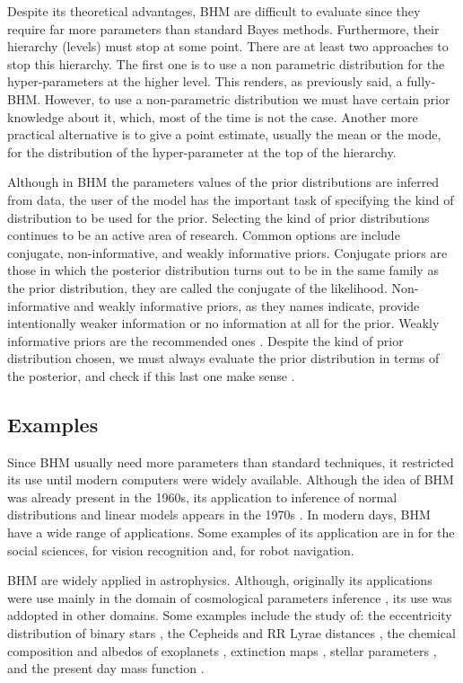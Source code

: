 Despite its theoretical advantages, BHM are difficult to evaluate since they require far more parameters than standard Bayes methods.
Furthermore, their hierarchy (levels) must stop at some point. There are at least two approaches to stop this hierarchy. The first one is to use a non parametric distribution for the hyper-parameters at the higher level. This renders, as previously said, a fully-BHM. However, to use a non-parametric distribution we must have certain prior knowledge about it, which, most of the time is not the case. Another more practical alternative is to give a point estimate, usually the mean or the mode, for the distribution of the hyper-parameter at the top of the hierarchy.  

Although in BHM the parameters values of the prior distributions are inferred from data, the user of the model has the important task of specifying the kind of distribution to be used for the prior. Selecting the kind of prior distributions continues to be an active area of research. Common options are include conjugate, non-informative, and weakly informative priors. Conjugate priors are those in which the posterior distribution turns out to be in the same family as the prior distribution, they are called the conjugate of the likelihood. Non-informative and weakly informative priors, as they names indicate, provide intentionally weaker information or no information at all for the prior. Weakly informative priors are the recommended ones \cite[see for example the works of][]{Gelman2006,Huang2013,Chung2015}. Despite the kind of prior distribution chosen, we must always evaluate the prior distribution in terms of the posterior, and check if this last one make sense \cite[][ Chap. 6]{Gelman2006,Gelman2013}.
\subsection{Examples}
Since BHM usually need more parameters than standard techniques, it restricted its use until modern computers were widely available.  
Although the idea of BHM was already present in the 1960s, its application to inference of normal distributions and linear models appears in the 1970s \cite[see][for an historical perspective of BHM]{Good1980}. In modern days, BHM have a wide range of applications. Some examples of its application are in \citet{Gelman2007} for the social sciences, \citet{Fei2005} for vision recognition and, \citet{Diard2008} for robot navigation.

BHM are widely applied in astrophysics. Although, originally its applications were use mainly in the domain of cosmological parameters inference \cite[see for example the works of][]{Feeney2013,March2014,Anderes2015,Shariff2016,Alsing2017}, its use was addopted in other domains. Some examples include the study of: the eccentricity distribution of binary stars \citet{Hogg2010}, the Cepheids  \citep{Barnes2004} and RR Lyrae distances \citep{Jefferys2007}, the chemical composition \citep{Wolfgang2015} and albedos of exoplanets \citep{Demory2014}, extinction maps \citep{Sale2012}, stellar parameters \citep{Shkedy2007}, and the present day mass function \citep{Tapiador2017}.
